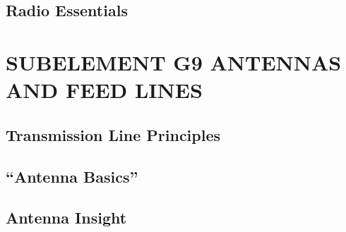 \documentclass[12pt]{book}
\begin{document}
\section{Radio Essentials}
















\chapter{SUBELEMENT G9  ANTENNAS AND FEED LINES}
\section{Transmission Line Principles}











\section{“Antenna Basics”}












\section{Antenna Insight}











\end{document}
